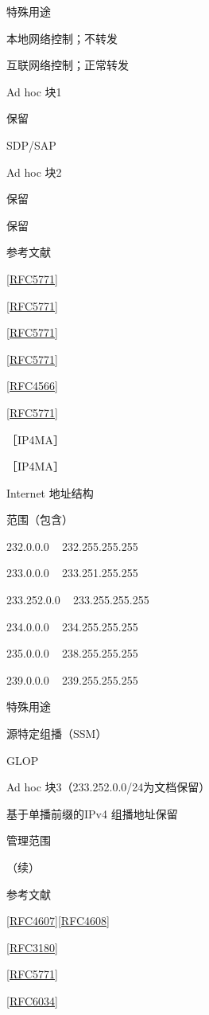 特殊用途

本地网络控制；不转发

互联网络控制；正常转发

Ad hoc 块1

保留

SDP/SAP

Ad hoc 块2

保留

保留

参考文献

\href{https://www.rfc-editor.org/rfc/rfc5771}{[RFC5771]}

\href{https://www.rfc-editor.org/rfc/rfc5771}{[RFC5771]}

\href{https://www.rfc-editor.org/rfc/rfc5771}{[RFC5771]}

\href{https://www.rfc-editor.org/rfc/rfc5771}{[RFC5771]}

\href{https://www.rfc-editor.org/rfc/rfc4566}{[RFC4566]}

\href{https://www.rfc-editor.org/rfc/rfc5771}{[RFC5771]}

［IP4MA］

［IP4MA］

Internet 地址结构

范围（包含）

232.0.0.0 ~ 232.255.255.255

233.0.0.0 ~ 233.251.255.255

233.252.0.0 ~ 233.255.255.255

234.0.0.0 ~ 234.255.255.255

235.0.0.0 ~ 238.255.255.255

239.0.0.0 ~ 239.255.255.255

特殊用途

源特定组播（SSM）

GLOP

Ad hoc 块3（233.252.0.0/24为文档保留）

基于单播前缀的IPv4 组播地址保留

管理范围

（续）

参考文献

\href{https://www.rfc-editor.org/rfc/rfc4607}{[RFC4607]}\href{https://www.rfc-editor.org/rfc/rfc4608}{[RFC4608]}

\href{https://www.rfc-editor.org/rfc/rfc3180}{[RFC3180]}

\href{https://www.rfc-editor.org/rfc/rfc5771}{[RFC5771]}

\href{https://www.rfc-editor.org/rfc/rfc6034}{[RFC6034]}

